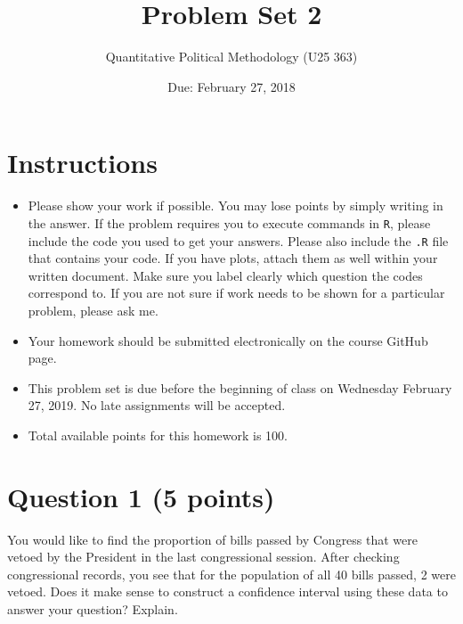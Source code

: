 \documentclass[12pt,letterpaper]{article}
\title{Problem Set 2}
\date{Due: February 27, 2018}
\author{Quantitative Political Methodology (U25 363)}
\begin{document}
	\maketitle

	
	\section*{Instructions}
	\begin{itemize}
		\item Please show your work if possible. You may lose points by simply writing in the answer. If the problem requires you to execute commands in \texttt{R}, please include the code you used to get your answers. Please also include the \texttt{.R} file that contains your code. If you have plots, attach them as well within your written document. Make sure you label clearly which question the codes correspond to. If you are not sure if work needs to be shown for a particular problem, please ask me.
		\item Your homework should be submitted electronically on the course GitHub page.
		\item This problem set is due before the beginning of class on Wednesday February 27, 2019. No late assignments will be accepted.
		\item Total available points for this homework is 100.
	\end{itemize}

\section*{Question 1 (5 points)}
You would like to find the proportion of bills passed by Congress that were vetoed by the
President in the last congressional session. After checking congressional records, you see that
for the population of all 40 bills passed, 2 were vetoed. Does it make sense to construct a
confidence interval using these data to answer your question? Explain.
\end{document}
